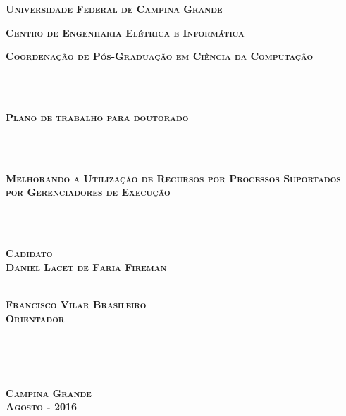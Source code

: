 
\pagestyle{empty}

\begin{center}
{\textbf{\textsc{Universidade Federal de Campina Grande}}}
\end{center}

\begin{center}
\textbf{{\textsc{Centro de Engenharia Elétrica e Informática}}}
\end{center}

\begin{center}
{\textsc{\textbf{Coordenação de Pós-Graduação em Ciência da Computação}}}
\end{center}

~\\ \\

\begin{center}
{\textsc{\textbf{Plano de trabalho para doutorado}}}
\end{center}

~\\ \\

\begin{center}
{\Large \textsc{\textbf{Melhorando a Utilização de Recursos por Processos Suportados por Gerenciadores de Execução}}}
\end{center}

~\\ \\

\begin{center}
\textbf{\textsc{Cadidato} \\
\textsc{Daniel Lacet de Faria Fireman}}
\end{center}

\vspace{2in}

\begin{center}
\makebox[3in]{\hrulefill} \\
\textbf{\textsc{Francisco Vilar Brasileiro} \\
\textsc{Orientador}}
\end{center}

~\\ \\ \\

\begin{center}
\textbf{{\large \textsc{Campina Grande}}
\\
{\large \textsc{Agosto - 2016}}}
\end{center}

\newpage
\cleardoublepage

